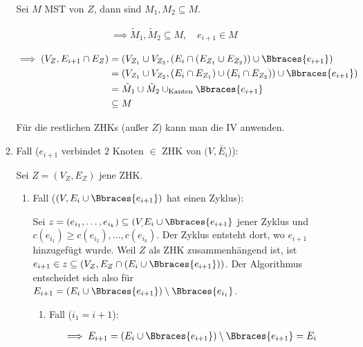 \begin{solution}
\begin{enumerate}[label = (\Alph*)]
\begin{enumerate}[label = \arabic*.]
        Sei $M$ MST von $Z$, dann sind $M_1, M_2 \subseteq M$.

        \begin{align*}
            \implies
            \tilde M_1, \tilde M_2 \subseteq M,
            \quad
            e_{i+1} \in M
        \end{align*}

        \begin{align*}
            \implies
            (V_Z, E_{i+1} \cap E_Z)
            & =
            (V_{Z_1} \cup V_{Z_2}, (E_i \cap (E_{Z_1} \cup E_{Z_2})) \cup \Bbraces{e_{i+1}}) \\
            & =
            (V_{Z_1} \cup V_{Z_2}, (E_i \cap E_{Z_1}) \cup (E_i \cap E_{Z_2})) \cup \Bbraces{e_{i+1}}) \\
            & =
            \tilde M_1 \cup \tilde M_2 \cup_\mathrm{Kanten} \Bbraces{e_{i+1}} \\
            & \subseteq
            M
        \end{align*}

        Für die restlichen ZHKs (außer $Z$) kann man die IV anwenden.

        \item Fall ($e_{i+1}$ verbindet $2$ Knoten $\in$ ZHK von $(V, \bar E_i$)):
        
        Sei $Z = (V_Z, E_Z)$ jene ZHK.
        
        \begin{enumerate}[label = 2.\arabic*.]

            \item Fall ($(V, E_i \cup \Bbraces{e_{i+1}})$ hat einen Zyklus):
            
            Sei $z = (e_{i_1}, \dots, e_{i_k}) \subseteq (V_, E_i \cup \Bbraces{e_{i+1}}$ jener Zyklus und $c(e_{i_1}) \geq c(e_{i_2}), \dots, c(e_{i_k})$.
            Der Zyklus entsteht dort, wo $e_{i+1}$ hinzugefügt wurde.
            Weil $Z$ als ZHK zusammenhängend ist, ist $e_{i+1} \in z \subseteq (V_Z, E_Z \cap (E_i \cup \Bbraces{e_{i+1}}))$.
            Der Algorithmus entscheidet sich also für $E_{i+1} = (E_i \cup \Bbraces{e_{i+1}}) \setminus \Bbraces{e_{i_1}}$.

            \begin{enumerate}[label = 2.1.\arabic*.]

                \item Fall ($i_1 = i+1$):
                
                \begin{align*}
                    \implies
                    E_{i+1}
                    =
                    (E_i \cup \Bbraces{e_{i+1}}) \setminus \Bbraces{e_{i+1}}
                    =
                    E_i
                \end{align*}


\end{enumerate}
\end{enumerate}
\end{enumerate}
\end{enumerate}
\end{solution}
